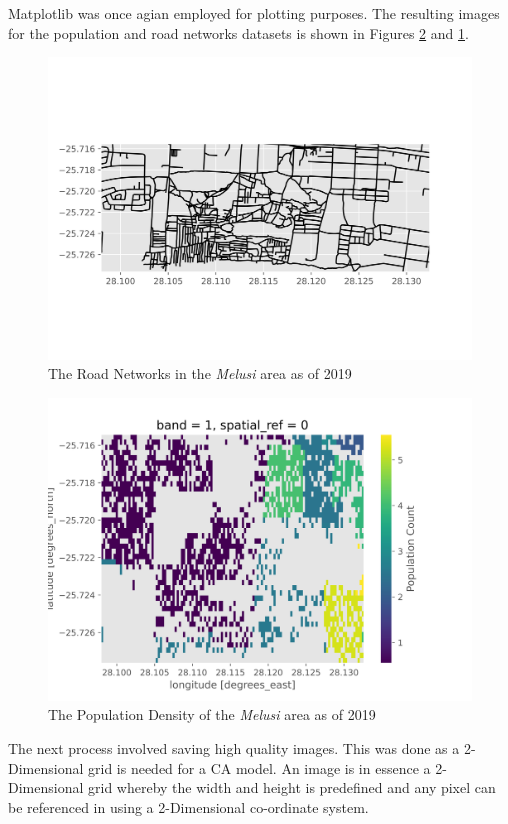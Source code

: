 Matplotlib was once agian employed for plotting purposes. The resulting images for the population and road networks datasets is shown in Figures \ref{fig:popgraph} and \ref{fig:roadgraph}.
\begin{figure}[H]
\centering
\includegraphics[width=1\textwidth]{Figures/Chapter3/Roads2019}
\caption{The Road Networks in the \textit{Melusi} area as of 2019}
\label{fig:roadgraph}
\end{figure}
\begin{figure}[H]
\centering
\includegraphics[width=1\textwidth]{Figures/Chapter3/Population2019}
\caption{The Population Density of the \textit{Melusi} area as of 2019}
\label{fig:popgraph}
\end{figure}
The next process involved saving high quality images. This was done as a 2-Dimensional grid is needed for a CA model. An image is in essence a 2-Dimensional grid whereby the width and height is predefined and any pixel can be referenced in using a 2-Dimensional co-ordinate system.
